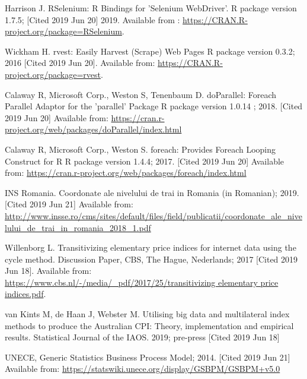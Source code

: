 \documentclass[]{article}
\begin{document}
\begin{thebibliography}{99}
Harrison J. RSelenium: R Bindings for 'Selenium WebDriver'. R package version 1.7.5; [Cited 2019 Jun 20] 2019. Available from :
\url{https://CRAN.R-project.org/package=RSelenium}.

Wickham H. rvest: Easily Harvest (Scrape) Web Pages {R package version 0.3.2}; 2016 [Cited 2019 Jun 20]. Available from:
\url{https://CRAN.R-project.org/package=rvest}.

Calaway R, Microsoft Corp., Weston S, Tenenbaum D. doParallel: Foreach Parallel Adaptor for the 'parallel' Package {R package version 1.0.14} ; 2018. [Cited 2019 Jun 20] Available from: \url{https://cran.r-project.org/web/packages/doParallel/index.html}

Calaway R, Microsoft Corp., Weston S. foreach: Provides Foreach Looping Construct for R {R package version 1.4.4}; 2017. [Cited 2019 Jun 20]
Available from: \url{https://cran.r-project.org/web/packages/foreach/index.html} 

INS Romania. Coordonate ale nivelului de trai in Romania (in Romanian); 2019. [Cited 2019 Jun 21] Available from:
\url{http://www.insse.ro/cms/sites/default/files/field/publicatii/coordonate_ale_nivelului_de_trai_in_romania_2018_1.pdf}

Willenborg L. Transitivizing elementary price indices for internet data using the cycle method. Discussion Paper, CBS, The Hague, Nederlands; 2017 [Cited 2019 Jun 18]. 
Available from: \url{https://www.cbs.nl/-/media/_pdf/2017/25/transitivizing elementary price indices.pdf}.

van Kints M, de Haan J, Webster M. Utilising big data and multilateral index methods to produce the Australian CPI: Theory, implementation and empirical results. Statistical Journal of the IAOS. 2019; pre-press [Cited 2019 Jun 18]

UNECE, Generic Statistics Business Process Model; 2014. [Cited 2019 Jun 21] Available from:
\url{https://statswiki.unece.org/display/GSBPM/GSBPM+v5.0}

\end{thebibliography}

\clearpage
\end{document}
